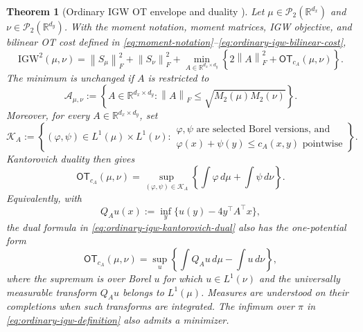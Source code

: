 \documentclass[11pt]{article}
\newcommand{\R}{\mathbb R}
\newcommand{\cP}{\mathcal P}
\newcommand{\norm}[1]{\left\lVert #1\right\rVert}
\newcommand{\IGW}{\mathrm{IGW}}
\theoremstyle{plain}
\newtheorem{theorem}{Theorem}[section]
\theoremstyle{definition}
\theoremstyle{remark}
\begin{document}
\begin{theorem}[Ordinary IGW OT envelope and duality
\cite{ZhangGoldfeldMrouehSriperumbudur,RiouxGoldfeldKato2024}]
\label{thm:ordinary-igw-envelope}
Let $\mu\in\cP_2(\R^{d_x})$ and $\nu\in\cP_2(\R^{d_y})$. With the
moment notation, moment matrices, IGW objective, and bilinear OT cost defined in
\eqref{eq:moment-notation}--\eqref{eq:ordinary-igw-bilinear-cost},
\begin{equation}\label{eq:ordinary-igw-envelope}
 \IGW^2(\mu,\nu)
 =\norm{S_\mu}_F^2+\norm{S_\nu}_F^2
 +\min_{A\in\R^{d_x\times d_y}}
 \left\{2\norm A_F^2+\mathsf{OT}_{c_A}(\mu,\nu)\right\}.
\end{equation}
The minimum is unchanged if $A$ is restricted to
\[
 \mathcal A_{\mu,\nu}:=
 \left\{A\in\R^{d_x\times d_y}:\norm A_F\le\sqrt{M_2(\mu)M_2(\nu)}\right\}.
\]
Moreover, for every $A\in\R^{d_x\times d_y}$, set
\[
  \mathcal K_A:=\left\{(\varphi,\psi)\in L^1(\mu)\times L^1(\nu):
  \begin{array}{l}\varphi,\psi\text{ are selected Borel versions, and}\\[-2pt]
  \varphi(x)+\psi(y)\le c_A(x,y)\text{ pointwise}\end{array}\right\}.
\]
Kantorovich duality then gives
\begin{equation}\label{eq:ordinary-igw-kantorovich-dual}
 \mathsf{OT}_{c_A}(\mu,\nu)
 =\sup_{(\varphi,\psi)\in\mathcal K_A}
 \left\{\int\varphi\,d\mu+\int\psi\,d\nu\right\}.
\end{equation}
Equivalently, with
\[
 Q_Au(x):=\inf_y\{u(y)-4y^\top A^\top x\},
\]
the dual formula in \eqref{eq:ordinary-igw-kantorovich-dual} also has the
one-potential form
\begin{equation}\label{eq:ordinary-igw-Q-dual}
 \mathsf{OT}_{c_A}(\mu,\nu)
 =\sup_u\left\{\int Q_Au\,d\mu-\int u\,d\nu\right\},
\end{equation}
where the supremum is over Borel $u$ for which $u\in L^1(\nu)$ and the
universally measurable transform $Q_Au$ belongs to $L^1(\mu)$. Measures are
understood on their completions when such transforms are integrated.
The infimum over $\pi$ in \eqref{eq:ordinary-igw-definition} also admits a
minimizer.
\end{theorem}
\end{document}

